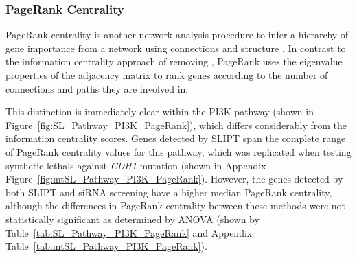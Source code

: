 \begin{table*}[!htb]
\caption{\acrshort{ANOVA} for synthetic lethality and information centrality}
\label{tab:SL_Pathway_PI3K_InfoCent}
\noindent{}
\end{table*} \filbreak

\FloatBarrier

\subsubsection{PageRank Centrality}  \label{chapt4:Network_PageRank}

\FloatBarrier

\gls{PageRank centrality} is another network analysis procedure to infer a hierarchy of gene importance from a network using connections and structure \citep{Brin1998}. In contrast to the \gls{information centrality} approach of removing , PageRank uses the eigenvalue properties of the adjacency matrix to rank genes according to the number of connections and paths they are involved in. 

This distinction is immediately clear within the \gls{PI3K} pathway (shown in Figure~\ref{fig:SL_Pathway_PI3K_PageRank}), which differs considerably from the \gls{information centrality} scores. Genes detected by \gls{SLIPT} span the complete range of \gls{PageRank centrality} values for this pathway, which was replicated when testing \glspl{synthetic lethal} against \textit{CDH1} \gls{mutation} (shown in Appendix Figure~\ref{fig:mtSL_Pathway_PI3K_PageRank}).  However, the genes detected by both \gls{SLIPT} and \gls{siRNA} screening have a higher median \gls{PageRank centrality}, although the differences in \gls{PageRank centrality} between these methods were not statistically significant as determined by \gls{ANOVA} (shown by Table~\ref{tab:SL_Pathway_PI3K_PageRank} and Appendix Table~\ref{tab:mtSL_Pathway_PI3K_PageRank}).

